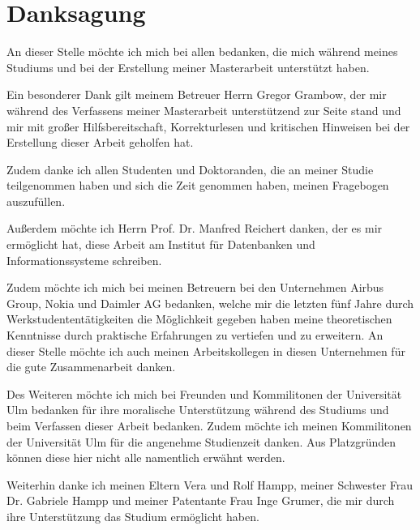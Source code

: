 \section*{Danksagung}

An dieser Stelle möchte ich mich bei allen bedanken, die mich während meines Studiums und bei der Erstellung meiner Masterarbeit unterstützt haben.

Ein besonderer Dank gilt meinem Betreuer Herrn Gregor Grambow, der mir während des Verfassens meiner Masterarbeit unterstützend zur Seite stand und mir mit großer Hilfsbereitschaft, Korrekturlesen und kritischen Hinweisen bei der Erstellung dieser Arbeit geholfen hat.

Zudem danke ich allen Studenten und Doktoranden, die an meiner Studie teilgenommen haben und sich die Zeit genommen haben, meinen Fragebogen auszufüllen.

Außerdem möchte ich Herrn Prof. Dr. Manfred Reichert danken, der es mir ermöglicht hat, diese Arbeit am Institut für Datenbanken und Informationssysteme schreiben.

Zudem möchte ich mich bei meinen Betreuern bei den Unternehmen Airbus Group, Nokia und Daimler AG bedanken, welche mir die letzten fünf Jahre durch Werkstudententätigkeiten die Möglichkeit gegeben haben meine theoretischen Kenntnisse durch praktische Erfahrungen zu vertiefen und zu erweitern. 
An dieser Stelle möchte ich auch meinen Arbeitskollegen in diesen Unternehmen für die gute Zusammenarbeit danken.

Des Weiteren möchte ich mich bei Freunden und Kommilitonen der Universität Ulm bedanken für ihre moralische Unterstützung während des Studiums und beim Verfassen dieser Arbeit bedanken. Zudem möchte ich meinen Kommilitonen der Universität Ulm für die angenehme Studienzeit danken. Aus Platzgründen können diese hier nicht alle namentlich erwähnt werden.

Weiterhin danke ich meinen Eltern Vera und Rolf Hampp, meiner Schwester Frau Dr. Gabriele Hampp und meiner Patentante Frau Inge Grumer, die mir durch ihre Unterstützung das Studium ermöglicht haben.